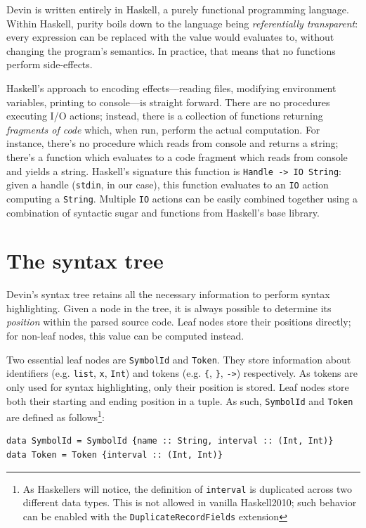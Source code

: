 \documentclass[11pt, american, draft]{PhdThesis}
\begin{document}
  Devin is written entirely in Haskell, a purely functional programming language. Within Haskell,
  purity boils down to the language being \emph{referentially transparent}: every expression can
  be replaced with the value would evaluates to, without changing the program's semantics. In
  practice, that means that no functions perform side-effects.

  Haskell's approach to encoding effects---reading files, modifying environment variables, printing
  to console---is straight forward. There are no procedures executing I/O actions; instead, there
  is a collection of functions returning \emph{fragments of code} which, when run, perform the
  actual computation. For instance, there's no procedure which reads from console and returns a
  string; there's a function which evaluates to a code fragment which reads from console and yields
  a string. Haskell's signature this function is \verb$Handle -> IO String$: given a handle
  (\verb$stdin$, in our case), this function evaluates to an \verb$IO$ action computing a
  \verb$String$. Multiple \verb$IO$ actions can be easily combined together using a combination of
  syntactic sugar and functions from Haskell's base library.

  \section{The syntax tree}

  Devin's syntax tree retains all the necessary information to perform syntax highlighting. Given a
  node in the tree, it is always possible to determine its \emph{position} within the parsed source
  code. Leaf nodes store their positions directly; for non-leaf nodes, this value can be computed
  instead.

  Two essential leaf nodes are \verb$SymbolId$ and \verb$Token$. They store information about
  identifiers (e.g. \verb$list$, \verb$x$, \verb$Int$) and tokens (e.g. \verb${$, \verb$}$, \verb$->$)
  respectively. As tokens are only used for syntax highlighting, only their position is stored.
  Leaf nodes store both their starting and ending position in a tuple. As such, \verb$SymbolId$ and
  \verb$Token$ are defined as follows\footnote{As Haskellers will notice, the definition of
  \mbox{\texttt{interval}} is duplicated across two different data types. This is not allowed in
  vanilla Haskell2010; such behavior can be enabled with the \mbox{\texttt{DuplicateRecordFields}}
  extension}:

  \begin{verbatim}
data SymbolId = SymbolId {name :: String, interval :: (Int, Int)}
data Token = Token {interval :: (Int, Int)}
  \end{verbatim}
\end{document}
